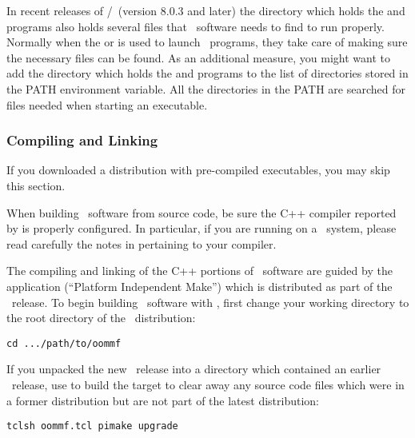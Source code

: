 In recent releases of
\Tcl/\Tk\ (version 8.0.3 and later) the directory which holds
the  and  programs also holds several
{} files that \OOMMF\ software needs to find to run properly.
Normally when the
 or
is used to launch \OOMMF\ programs, they take care of making sure
the necessary {} files can be found.
As an additional measure, you might want to add the directory
which holds the  and  programs to the list
of directories stored in the 
PATH
environment variable.  All the
directories in the PATH are searched for {} files
needed when starting an executable.

\subsubsection{Compiling and Linking}\label{sec:install.compile}

If you downloaded a distribution with pre-compiled executables, you may
skip this section.

When building \OOMMF\ software from source code, be sure the C++
compiler reported by  is properly configured.
In particular, if you are running on a \Windows\ system, please read
carefully the notes in 
  pertaining to your
compiler.

The compiling and linking of the C++ portions of \OOMMF\ software 
are guided by the application
(``Platform Independent Make'') which 
is distributed as part of the \OOMMF\ release.
To begin building \OOMMF\ software with , first change
your working directory
to the root directory of the \OOMMF\ distribution:
\begin{verbatim}
cd .../path/to/oommf
\end{verbatim}

If you unpacked the new \OOMMF\ release into a directory 
which contained an earlier \OOMMF\ release, 
use  to build the target 
to clear away any source code files which were 
in a former distribution but are not part of the latest distribution:
\begin{verbatim}
tclsh oommf.tcl pimake upgrade
\end{verbatim}

